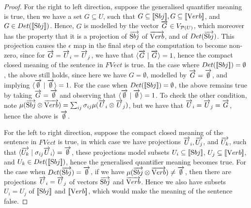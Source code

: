 \begin{proof}
For the right to left direction, suppose the generalised quantifier meaning is true, then we have a set $G \subseteq U$, such that  $G\subseteq[\![ \text Sbj ]\!], G \subseteq [\![ \text Verb ]\!]$, and $G \in Det ([\![ \text Sbj ]\!])$. Hence, $G$ is modelled by the vector $\overrightarrow{G} \in V_{{\cal P}(U)}$, which moreover has the property that it is a projection of $\overrightarrow{\text Sbj}$ of  $\overrightarrow{\text Verb}$, and of $Det(\overrightarrow{\text Sbj})$. This projection  causes the $\epsilon$ map in the final step of the computation to become non-zero, since for $\overrightarrow{G} = \overrightarrow{U}_i = \overrightarrow{U}_j$, we have that  $\langle \overrightarrow{G} \mid \overrightarrow{G}\rangle = {1}$, hence the compact closed meaning of the sentence in $FVect$ is  true. In the case where $Det([\![ \text Sbj ]\!]) = \emptyset$, the above still holds, since here we  have $G = {\emptyset}$, modelled by  $\overrightarrow{G} = \overrightarrow{\emptyset}$, and implying  $\langle \overrightarrow{\emptyset} \mid \overrightarrow{\emptyset} \rangle = 1$. For the case when $Det([\![ \text Sbj ]\!]) = \emptyset$, the above remains true by taking $\overrightarrow{G} = \overrightarrow{\emptyset}$ and observing that $\langle \overrightarrow{\emptyset} \mid \overrightarrow{\emptyset} \rangle = 1$.  To check  the other condition, note  $
\mu(\overrightarrow{\text Sbj} \otimes \overrightarrow{\text Verb}) = \sum_{ij} \sigma_{ij} \mu(\overrightarrow{U}_i \otimes \overrightarrow{U}_j)$, 
but we have that  $\overrightarrow{U}_i = \overrightarrow{U}_j = \overrightarrow{G}$, hence the above is   $\overrightarrow{\emptyset}$. 

For the left to right direction, suppose the compact closed meaning of the sentence in $FVect$ is true, in which case we have projections $\overrightarrow{U}_i, \overrightarrow{U_j}$, and $\overrightarrow{U_k}$, such that $\langle \overrightarrow{U_k} \mid \sigma_{ij} \overrightarrow{U}_i \rangle = \overrightarrow{\emptyset}$, these projections model subsets $U_i \subseteq [\![ \text Sbj ]\!]$, $U_j \subseteq [\![ \text Verb ]\!]$, and $U_k \in Det([\![ \text Sbj ]\!])$, hence the generalised quantifier meaning becomes true. For the case when $Det(\overrightarrow{\text Sbj}) = \overrightarrow{\emptyset}$,  if we have  $\mu(\overrightarrow{\text Sbj} \otimes \overrightarrow{\text Verb}) \neq \overrightarrow{\emptyset}$, then there are projections $\overrightarrow{U}_i= \overrightarrow{U}_j$ of vectors $\overrightarrow{\text Sbj}$ and $\overrightarrow{\text Verb}$. Hence we  also have subsets $U_i = U_j$ of  $[\![ \text Sbj ]\!]$ and $ [\![ \text Verb ]\!]$, which would  make the meaning of the sentence false.  
\end{proof}


